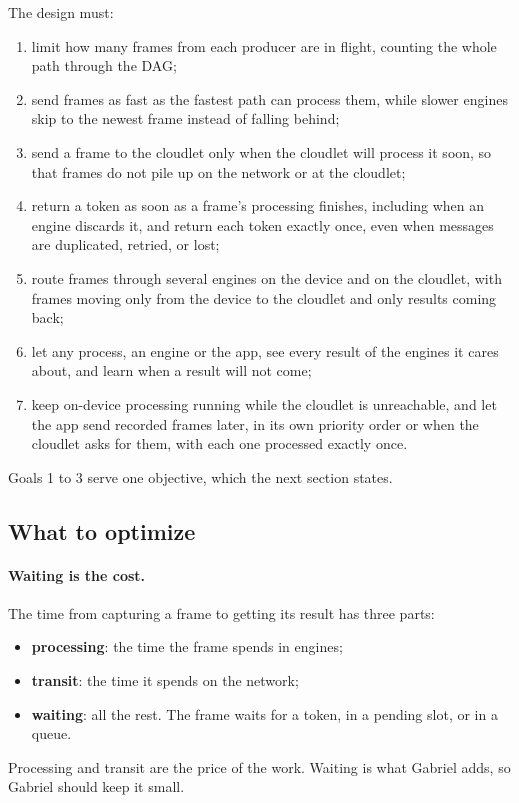 \documentclass[11pt]{article}
\begin{document}
The design must:
\begin{enumerate}[nosep]
  \item limit how many frames from each producer are in flight, counting the
        whole path through the DAG;
  \item send frames as fast as the fastest path can process them, while
        slower engines skip to the newest frame instead of falling behind;
  \item send a frame to the cloudlet only when the cloudlet will process it
        soon, so that frames do not pile up on the network or at the
        cloudlet;
  \item return a token as soon as a frame's processing finishes, including
        when an engine discards it, and return each token exactly once, even
        when messages are duplicated, retried, or lost;
  \item route frames through several engines on the device and on the
        cloudlet, with frames moving only from the device to the cloudlet and
        only results coming back;
  \item let any process, an engine or the app, see every result of the
        engines it cares about, and learn when a result will not come;
  \item keep on-device processing running while the cloudlet is unreachable,
        and let the app send recorded frames later, in its own priority order
        or when the cloudlet asks for them, with each one processed exactly
        once.
\end{enumerate}
Goals 1 to 3 serve one objective, which the next section states.

\subsection{What to optimize}
\label{sec:objective}

\paragraph{Waiting is the cost.} The time from capturing a frame to getting
its result has three parts:
\begin{itemize}[nosep]
  \item \textbf{processing}: the time the frame spends in engines;
  \item \textbf{transit}: the time it spends on the network;
  \item \textbf{waiting}: all the rest. The frame waits for a token, in a
        pending slot, or in a queue.
\end{itemize}
Processing and transit are the price of the work. Waiting is what Gabriel
adds, so Gabriel should keep it small.
\end{document}
